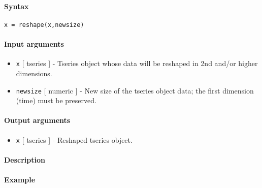 


	\paragraph{Syntax}

\begin{verbatim}
x = reshape(x,newsize)
\end{verbatim}

\paragraph{Input arguments}

\begin{itemize}
\item
  \texttt{x} {[} tseries {]} - Tseries object whose data will be
  reshaped in 2nd and/or higher dimensions.
\item
  \texttt{newsize} {[} numeric {]} - New size of the tseries object
  data; the first dimension (time) must be preserved.
\end{itemize}

\paragraph{Output arguments}

\begin{itemize}
\itemsep1pt\parskip0pt
\item
  \texttt{x} {[} tseries {]} - Reshaped tseries object.
\end{itemize}

\paragraph{Description}

\paragraph{Example}


